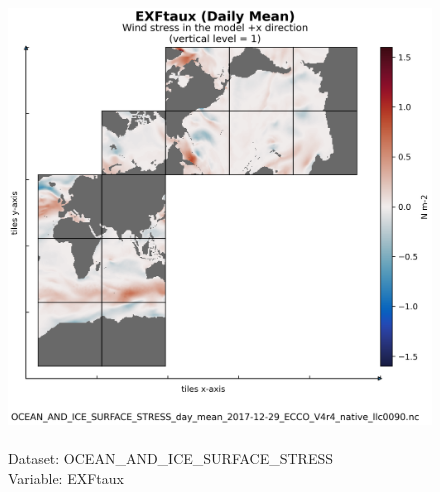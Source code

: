 \begin{figure}[H]
\centering
\includegraphics[scale=0.5]{../images/plots/native_plots/Ocean_and_Sea-Ice_Surface_Stress/EXFtaux.png}
\caption{\\Dataset: OCEAN\_AND\_ICE\_SURFACE\_STRESS\\Variable: EXFtaux}
\label{tab:table-OCEAN_AND_ICE_SURFACE_STRESS_EXFtaux-Plot}
\end{figure}
\pagebreak
